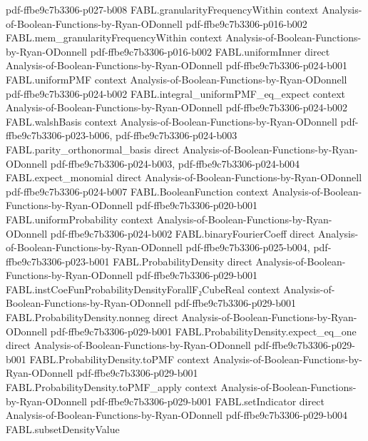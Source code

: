 \begin{theorem}
  {pdf-ffbe9c7b3306-p027-b008}
\proofstep
  {FABL.granularityFrequencyWithin}
  {context}
  {Analysis-of-Boolean-Functions-by-Ryan-ODonnell}
  {pdf-ffbe9c7b3306-p016-b002}
\proofstep
  {FABL.mem_granularityFrequencyWithin}
  {context}
  {Analysis-of-Boolean-Functions-by-Ryan-ODonnell}
  {pdf-ffbe9c7b3306-p016-b002}
\proofstep
  {FABL.uniformInner}
  {direct}
  {Analysis-of-Boolean-Functions-by-Ryan-ODonnell}
  {pdf-ffbe9c7b3306-p024-b001}
\proofstep
  {FABL.uniformPMF}
  {context}
  {Analysis-of-Boolean-Functions-by-Ryan-ODonnell}
  {pdf-ffbe9c7b3306-p024-b002}
\proofstep
  {FABL.integral_uniformPMF_eq_expect}
  {context}
  {Analysis-of-Boolean-Functions-by-Ryan-ODonnell}
  {pdf-ffbe9c7b3306-p024-b002}
\proofstep
  {FABL.walshBasis}
  {context}
  {Analysis-of-Boolean-Functions-by-Ryan-ODonnell}
  {pdf-ffbe9c7b3306-p023-b006,
    pdf-ffbe9c7b3306-p024-b003}
\proofstep
  {FABL.parity_orthonormal_basis}
  {direct}
  {Analysis-of-Boolean-Functions-by-Ryan-ODonnell}
  {pdf-ffbe9c7b3306-p024-b003,
    pdf-ffbe9c7b3306-p024-b004}
\proofstep
  {FABL.expect_monomial}
  {direct}
  {Analysis-of-Boolean-Functions-by-Ryan-ODonnell}
  {pdf-ffbe9c7b3306-p024-b007}
\proofstep
  {FABL.BooleanFunction}
  {context}
  {Analysis-of-Boolean-Functions-by-Ryan-ODonnell}
  {pdf-ffbe9c7b3306-p020-b001}
\proofstep
  {FABL.uniformProbability}
  {context}
  {Analysis-of-Boolean-Functions-by-Ryan-ODonnell}
  {pdf-ffbe9c7b3306-p024-b002}
\proofstep
  {FABL.binaryFourierCoeff}
  {direct}
  {Analysis-of-Boolean-Functions-by-Ryan-ODonnell}
  {pdf-ffbe9c7b3306-p025-b004,
    pdf-ffbe9c7b3306-p023-b001}
\proofstep
  {FABL.ProbabilityDensity}
  {direct}
  {Analysis-of-Boolean-Functions-by-Ryan-ODonnell}
  {pdf-ffbe9c7b3306-p029-b001}
\proofstep
  {FABL.instCoeFunProbabilityDensityForallF₂CubeReal}
  {context}
  {Analysis-of-Boolean-Functions-by-Ryan-ODonnell}
  {pdf-ffbe9c7b3306-p029-b001}
\proofstep
  {FABL.ProbabilityDensity.nonneg}
  {direct}
  {Analysis-of-Boolean-Functions-by-Ryan-ODonnell}
  {pdf-ffbe9c7b3306-p029-b001}
\proofstep
  {FABL.ProbabilityDensity.expect_eq_one}
  {direct}
  {Analysis-of-Boolean-Functions-by-Ryan-ODonnell}
  {pdf-ffbe9c7b3306-p029-b001}
\proofstep
  {FABL.ProbabilityDensity.toPMF}
  {context}
  {Analysis-of-Boolean-Functions-by-Ryan-ODonnell}
  {pdf-ffbe9c7b3306-p029-b001}
\proofstep
  {FABL.ProbabilityDensity.toPMF_apply}
  {context}
  {Analysis-of-Boolean-Functions-by-Ryan-ODonnell}
  {pdf-ffbe9c7b3306-p029-b001}
\proofstep
  {FABL.setIndicator}
  {direct}
  {Analysis-of-Boolean-Functions-by-Ryan-ODonnell}
  {pdf-ffbe9c7b3306-p029-b004}
\proofstep
  {FABL.subsetDensityValue}

\end{theorem}
